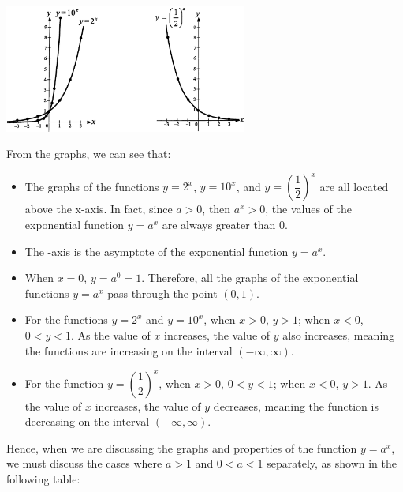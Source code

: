 \documentclass{report}
\begin{document}
\begin{center}
	\includegraphics[width=0.6\textwidth]{assets/12-1.png}
\end{center}

\vspace{-1em}
From the graphs, we can see that:

\vspace{-1em}
\begin{itemize}
	\item The graphs of the functions $y=2^x$, $y=10^x$, and $y=\left(\dfrac{1}{2}\right)^x$ are all located above the x-axis. In fact, since $a > 0$, then $a^x > 0$, the values of the exponential function $y=a^x$ are always greater than 0.
	\item The $ $-axis is the asymptote of the exponential function $y=a^x$.
	\item When $x=0$, $y=a^0=1$. Therefore, all the graphs of the exponential functions $y=a^x$ pass through the point $(0,1)$.
	\item For the functions $y=2^x$ and $y=10^x$, when $x>0$, $y>1$; when $x<0$, $0<y<1$. As the value of $x$ increases, the value of $y$ also increases, meaning the functions are increasing on the interval $(-\infty, \infty)$.
	\item For the function $y=\left(\dfrac{1}{2}\right)^x$, when $x>0$, $0<y<1$; when $x<0$, $y>1$. As the value of $x$ increases, the value of $y$ decreases, meaning the function is decreasing on the interval $(-\infty, \infty)$.
\end{itemize}

\vspace{-1em}
Hence, when we are discussing the graphs and properties of the function $y=a^x$, we must discuss the cases where $a > 1$ and $0 < a < 1$ separately, as shown in the following table:
\end{document}
